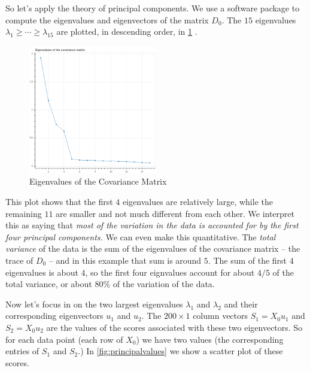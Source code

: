 \documentclass[
]{article}
\begin{document}
So let's apply the theory of principal components. We use a software
package to compute the eigenvalues and eigenvectors of the matrix
\(D_{0}\). The \(15\) eigenvalues
\(\lambda_{1}\ge \cdots \ge \lambda_{15}\) are plotted, in descending
order, in \cref{fig:eigenvalues} .

\begin{figure}
\hypertarget{fig:eigenvalues}{%
\centering
\includegraphics[width=0.5\textwidth,height=\textheight]{../img/eigenvalues.png}
\caption{Eigenvalues of the Covariance Matrix}\label{fig:eigenvalues}
}
\end{figure}

This plot shows that the first \(4\) eigenvalues are relatively large,
while the remaining \(11\) are smaller and not much different from each
other. We interpret this as saying that \emph{most of the variation in
the data is accounted for by the first four principal components.} We
can even make this quantitative. The \emph{total variance} of the data
is the sum of the eigenvalues of the covariance matrix -- the trace of
\(D_{0}\) -- and in this example that sum is around \(5\). The sum of
the first \(4\) eigenvalues is about \(4\), so the first four eignvalues
account for about \(4/5\) of the total variance, or about \(80\%\) of
the variation of the data.

Now let's focus in on the two largest eigenvalues \(\lambda_{1}\) and
\(\lambda_{2}\) and their corresponding eigenvectors \(u_{1}\) and
\(u_{2}\). The \(200\times 1\) column vectors \(S_{1}=X_{0}u_{1}\) and
\(S_{2}=X_{0}u_{2}\) are the values of the scores associated with these
two eigenvectors. So for each data point (each row of \(X_{0}\)) we have
two values (the corresponding entries of \(S_{1}\) and \(S_{2}\).) In
\cref{fig:principalvalues} we show a scatter plot of these scores.
\end{document}
